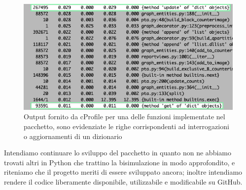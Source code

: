 \begin{figure}
    \includegraphics[width=\textwidth]{./sezione3/future/resources/profiler.png}
    \caption{Output fornito da cProfile per una delle funzioni implementate nel pacchetto, sono evidenziate le righe corrispondenti ad interrogazioni o aggiornamenti di un dizionario}
    \label{fig:cprofile_result}
\end{figure}

Intendiamo continuare lo sviluppo del pacchetto in quanto non ne abbiamo trovati altri in Python che trattino la bisimulazione in modo approfondito, e riteniamo che il progetto meriti di essere sviluppato ancora; inoltre intendiamo rendere il codice liberamente disponibile, utilizzabile e modificabile su GitHub.
